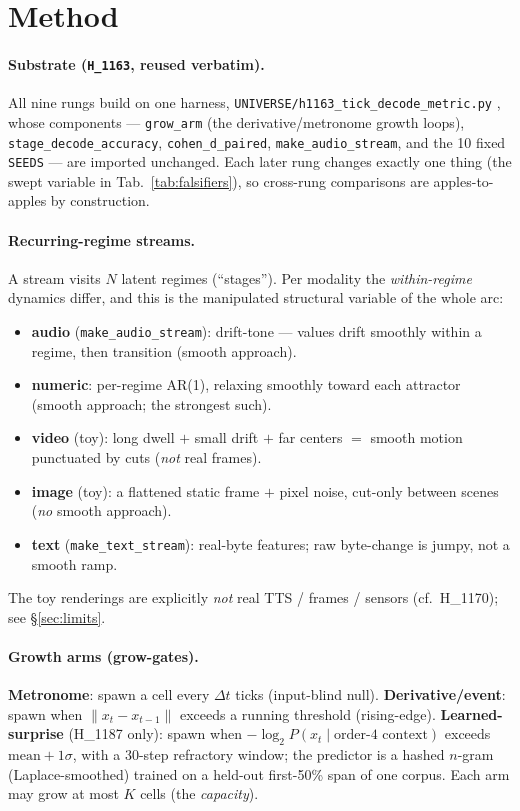 \documentclass[11pt,a4paper]{article}
\begin{document}
\section{Method}
\label{sec:method}

\paragraph{Substrate (\texttt{H\_1163}, reused verbatim).}
All nine rungs build on one harness, \texttt{UNIVERSE/h1163\_tick\_decode\_metric.py}
\citep{anima_h1163}, whose components --- \texttt{grow\_arm} (the
derivative/metronome growth loops), \texttt{stage\_decode\_accuracy},
\texttt{cohen\_d\_paired}, \texttt{make\_audio\_stream}, and the 10 fixed
\texttt{SEEDS} --- are imported unchanged. Each later rung changes exactly one
thing (the swept variable in Tab.~\ref{tab:falsifiers}), so cross-rung
comparisons are apples-to-apples by construction.

\paragraph{Recurring-regime streams.}
A stream visits $N$ latent regimes (``stages''). Per modality the
\emph{within-regime} dynamics differ, and this is the manipulated structural
variable of the whole arc:
\begin{itemize}\itemsep0.15em
\item \textbf{audio} (\texttt{make\_audio\_stream}): drift-tone --- values drift
  smoothly within a regime, then transition (smooth approach).
\item \textbf{numeric}: per-regime AR(1), relaxing smoothly toward each attractor
  (smooth approach; the strongest such).
\item \textbf{video} (toy): long dwell $+$ small drift $+$ far centers $=$
  smooth motion punctuated by cuts (\emph{not} real frames).
\item \textbf{image} (toy): a flattened static frame $+$ pixel noise, cut-only
  between scenes (\emph{no} smooth approach).
\item \textbf{text} (\texttt{make\_text\_stream}): real-byte features; raw
  byte-change is jumpy, not a smooth ramp.
\end{itemize}
The toy renderings are explicitly \emph{not} real TTS / frames / sensors (cf.\
H\_1170); see \S\ref{sec:limits}.

\paragraph{Growth arms (grow-gates).}
\textbf{Metronome}: spawn a cell every $\Delta t$ ticks (input-blind null).
\textbf{Derivative/event}: spawn when $\lVert x_t-x_{t-1}\rVert$ exceeds a running
threshold (rising-edge). \textbf{Learned-surprise} (H\_1187 only): spawn when
$-\log_2 P(x_t\mid \text{order-4 context})$ exceeds $\text{mean}{+}1\sigma$, with a
30-step refractory window; the predictor is a hashed $n$-gram (Laplace-smoothed)
trained on a held-out first-50\% span of one corpus. Each arm may grow at most $K$
cells (the \emph{capacity}).
\end{document}
